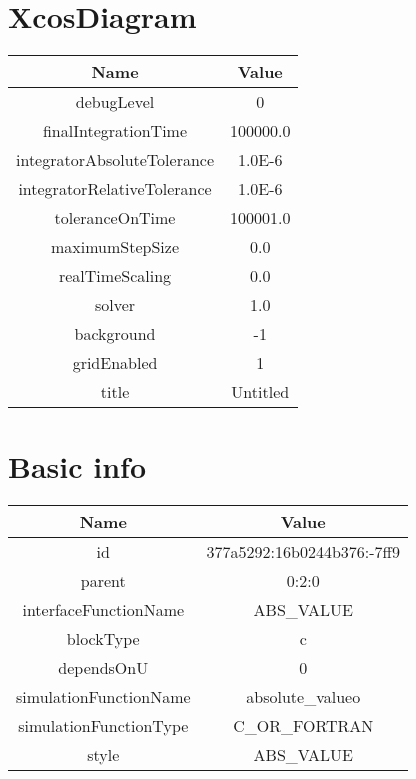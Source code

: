 \documentclass{article}%
\begin{document}
%
\normalsize%
%
\section{XcosDiagram}%
\label{sec:XcosDiagram}%
\begin{tabular}{|c|c|}%
\hline%
Name&Value\\%
\hline%
debugLevel&0\\%
\hline%
finalIntegrationTime&100000.0\\%
\hline%
integratorAbsoluteTolerance&1.0E{-}6\\%
\hline%
integratorRelativeTolerance&1.0E{-}6\\%
\hline%
toleranceOnTime&100001.0\\%
\hline%
maximumStepSize&0.0\\%
\hline%
realTimeScaling&0.0\\%
\hline%
solver&1.0\\%
\hline%
background&{-}1\\%
\hline%
gridEnabled&1\\%
\hline%
title&Untitled\\%
\hline%
\end{tabular}

%
\section{Basic info}%
\label{sec:Basic info}%
\begin{tabular}{|c|c|}%
\hline%
Name&Value\\%
\hline%
id&377a5292:16b0244b376:{-}7ff9\\%
\hline%
parent&0:2:0\\%
\hline%
interfaceFunctionName&ABS\_VALUE\\%
\hline%
blockType&c\\%
\hline%
dependsOnU&0\\%
\hline%
simulationFunctionName&absolute\_valueo\\%
\hline%
simulationFunctionType&C\_OR\_FORTRAN\\%
\hline%
style&ABS\_VALUE\\%
\hline%
\end{tabular}

%
\end{document}
